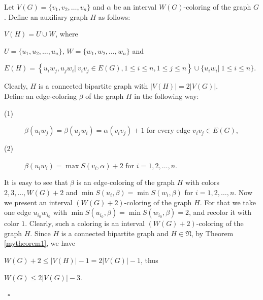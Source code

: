 \documentclass[fleqn,12pt,twoside]{article}
\newenvironment{proof}[1][Proof.]{\begin{trivlist}
\item[\hskip \labelsep {\bfseries #1}]}{\end{trivlist}}
\begin{document}
\begin{proof}[Proof of Theorem \ref{mytheorem3}.] Let $V(G)=\{v_{1},v_{2},\ldots,v_{n}\}$ and $\alpha$ be an
interval $W(G)$-coloring of the graph $G$. Define an auxiliary graph
$H$ as follows:
\begin{center}
$V(H)=U\cup W$, where
\end{center}
\begin{center}
$U=\{u_{1},u_{2},\ldots,u_{n}\}$, $W=\{w_{1},w_{2},\ldots,w_{n}\}$
and
\end{center}
\begin{center}
$E(H)=\left\{u_{i}w_{j},u_{j}w_{i}|~v_{i}v_{j}\in E(G), 1\leq i\leq
n,1\leq j\leq n\right\}\cup \{u_{i}w_{i}|~1\leq i\leq n\}$.
\end{center}

Clearly, $H$ is a connected bipartite graph with $\vert V(H)\vert =
2\vert V(G)\vert$.\\

Define an edge-coloring $\beta$ of the graph $H$ in the following
way:
\begin{description}
\item[(1)] $\beta (u_{i}w_{j})=\beta (u_{j}w_{i})=\alpha(v_{i}v_{j})+1$ for
every edge $v_{i}v_{j}\in E(G)$,

\item[(2)] $\beta (u_{i}w_{i})=\max S(v_{i},\alpha)+2$ for
$i=1,2,\ldots,n$.
\end{description}

It is easy to see that $\beta$ is an edge-coloring of the graph $H$
with colors $2,3,\ldots,W(G)+2$ and $\min S(u_{i},\beta)=\min
S(w_{i},\beta)$ for $i=1,2,\ldots,n$. Now we present an interval
$(W(G)+2)$-coloring of the graph $H$. For that we take one edge
$u_{i_{0}}w_{i_{0}}$ with $\min S(u_{i_{0}},\beta)=\min
S(w_{i_{0}},\beta)=2$, and recolor it with color $1$. Clearly, such
a coloring is an interval $(W(G)+2)$-coloring of the graph $H$.
Since $H$ is a connected bipartite graph and $H\in \mathfrak{N}$, by
Theorem \ref{mytheorem1}, we have
\begin{center}
$W(G)+2\leq \vert V(H)\vert -1 = 2\vert V(G)\vert-1$, thus
\end{center}
\begin{center}
$W(G)\leq 2\vert V(G)\vert-3$.
\end{center}
~$\square$
\end{proof}
\end{document}
